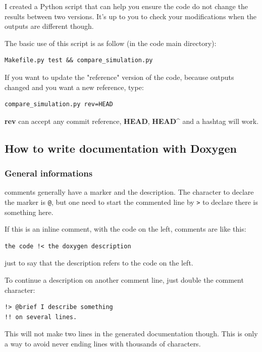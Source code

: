 \documentclass[english,a4paper,twoside]{article}
\begin{document}
I created a Python script  that can help you ensure the code do not change the results between two versions. It's up to you to check your modifications when the outputs are different though.

\bigskip

The basic use of this script is as follow (in the code main directory):
\begin{verbatim}
Makefile.py test && compare_simulation.py
\end{verbatim}

\bigskip

If you want to update the "reference" version of the code, because outputs changed and you want a new reference, type:
\begin{verbatim}
compare_simulation.py rev=HEAD
\end{verbatim}
\textbf{rev} can accept any commit reference, \textbf{HEAD}, \textbf{HEAD\^} and a hashtag will work.

\subsection{How to write documentation with Doxygen}
\subsubsection{General informations}
 comments generally have a marker and the description. The character to declare the marker is \verb|@|, but one need to start the commented line by \verb|>| to declare there is something here. 

If this is an inline comment, with the code on the left, comments are like this:
\begin{verbatim}
the code !< the doxygen description
\end{verbatim}
just to say that the description refers to the code on the left.

To continue a description on another comment line, just double the comment character:
\begin{verbatim}
!> @brief I describe something
!! on several lines.
\end{verbatim}

\begin{remarque}
This will not make two lines in the generated documentation though. This is only a way to avoid never ending lines with thousands of characters.
\end{remarque}
\end{document}
